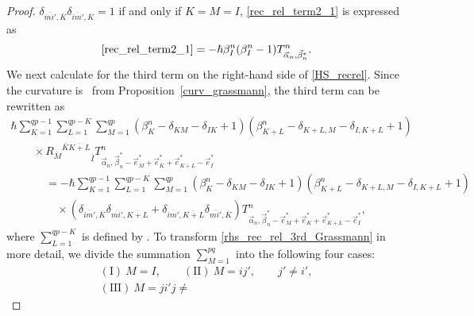 \documentclass[10pt,a4paper]{amsart}
\numberwithin{equation}{section}
\begin{document}
\begin{proof}
$
 \delta_{
 \overline{mi'},
 \overline{K}
 }
 \delta_{
 \overline{im'},
 \overline{K}
 }
 =
 1
$
if and only if $K=M=I$, \eqref{rec_rel_term2_1} is expressed as
\begin{align}
 \eqref{rec_rel_term2_1}
 =
 -
 \hbar
 \beta_{I}^{n}
 (
 \beta_{I}^{n}
 -
 1
 )
 T^{n}_{\vec{\alpha}_{n},\vec{\beta}_{n}^{\ast}}.
 \label{recrel_gene_2nd}
\end{align}
We next calculate for the third term on the right-hand side of \eqref{HS_recrel}. Since the curvature is~
from Proposition~\ref{curv_grassmann}, the third term can be rewritten as
\begin{gather}
 \hbar
 \sum_{K=1}^{qp-1}
 \sum_{L=1}^{qp-K}
 \sum_{M=1}^{qp}
 (
 \beta_{K}^{n}
 -
 \delta_{KM}
 -
 \delta_{IK}
 +
 1
 )
 (
 \beta_{K+L}^{n}
 -
 \delta_{K+L,M}
 -
 \delta_{I,K+L}
 +
 1
 )
 \nonumber
 \\
 \qquad
 \times
 {{R_{\overline{M}}}^{\overline{K} \overline{K+L}}}_{\overline{I}}
 T^{n}_{\vec{\alpha}_{n},\vec{\beta}_{n}^{\ast}-\vec{e}_{M}^{\ast}+\vec{e}_{K}^{\ast}+\vec{e}_{K+L}^{\ast}-\vec{e}_{I}^{\ast}}
 \nonumber
 \\
 \phantom{\qquad
 \times}{}=
 -
 \hbar
 \sum_{K=1}^{qp-1}
 \sum_{L=1}^{qp-K}
 \sum_{M=1}^{qp}
 (
 \beta_{K}^{n}
 -
 \delta_{KM}
 -
 \delta_{IK}
 +
 1
 )
 (
 \beta_{K+L}^{n}
 -
 \delta_{K+L,M}
 -
 \delta_{I,K+L}
 +
 1
 )
 \nonumber
 \\
 \phantom{\qquad
 \times=}{}
 \times
 (
 \delta_{
 \overline{im'},
 \overline{K}
 }
 \delta_{
 \overline{mi'},
 \overline{K+L}
 }
 +
 \delta_{
 \overline{im'},
 \overline{K+L}
 }
 \delta_{
 \overline{mi'},
 \overline{K}
 }
 )
 T^{n}_{\vec{\alpha}_{n},\vec{\beta}_{n}^{\ast}-\vec{e}_{M}^{\ast}+\vec{e}_{K}^{\ast}+\vec{e}_{K+L}^{\ast}-\vec{e}_{I}^{\ast}},
 \label{rhs_rec_rel_3rd_Grassmann}
\end{gather}
where $\sum_{L=1}^{qp-K}$ is defined by
.
To transform \eqref{rhs_rec_rel_3rd_Grassmann} in more detail, we divide the summation $\sum_{M=1}^{pq}$ into the following four cases:
\begin{gather*}
 (\textrm{I}) \
 M=I,
 \qquad
 (\textrm{II}) \
 M=ij',
\qquad
 j'
 \neq
 i',
 \\
 (\textrm{III}) \
 M=ji'
 j
 \neq

\end{gather*}
\end{proof}
\end{document}
